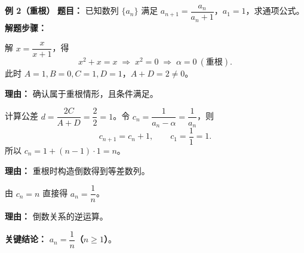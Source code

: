 \begin{examplebox}
	\medskip
	\textbf{\textcolor{CExample}{例 2（重根）}}
	\textbf{\textcolor{CExample}{题目：}} 已知数列 $\{a_n\}$ 满足 $a_{n+1}=\dfrac{a_n}{a_n+1}$，$a_1=1$，求通项公式。\textbf{\textcolor{CExample}{解题步骤：}}
	\begin{description}[style=nextline, leftmargin=2.8em, labelsep=0.5em, itemsep=0.45em]
		\item[\textbf{第一步（不动点求解）：}]
			解 $x=\dfrac{x}{x+1}$，得
			\[
				x^2+x=x\;\Longrightarrow\; x^2=0\;\Longrightarrow\; \alpha=0\ (\text{重根}).
			\]
			此时 $A=1,B=0,C=1,D=1$，$A+D=2\neq0$。
			\par\textbf{理由：} 确认属于重根情形，且条件满足。
		\item[\textbf{第二步（构造等差）：}]
			计算公差 $d=\dfrac{2C}{A+D}=\dfrac{2}{2}=1$。令 $c_n=\dfrac{1}{a_n-\alpha}=\dfrac{1}{a_n}$，则
			\[
				c_{n+1}=c_n+1,
				\qquad
				c_1=\frac{1}{1}=1.
			\]
			所以 $c_n=1+(n-1)\cdot1=n$。
			\par\textbf{理由：} 重根时构造倒数得到等差数列。
		\item[\textbf{第三步（反解通项）：}]
			由 $c_n=n$ 直接得 $a_n=\dfrac{1}{n}$。
			\par\textbf{理由：} 倒数关系的逆运算。
	\end{description}
	\textbf{\textcolor{CExample}{关键结论：}}
	\textbf{$a_n = \dfrac{1}{n}$（$n\ge 1$）}。


\end{examplebox}
